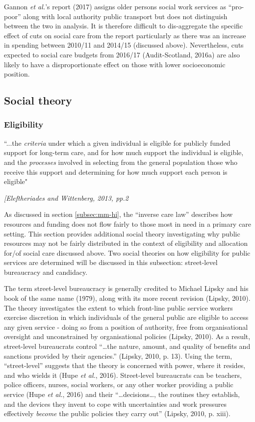 \documentclass[12pt,a4paper,oneside,table]{report}
\begin{document}
Gannon \textit{et al.}'s report (2017) assigns older persons social work
services as ``pro-poor'' along with local authority public transport but
does not distinguish between the two in analysis. It is therefore
difficult to dis-aggregate the specific effect of cuts on social care
from the report particularly as there was an increase in spending
between 2010/11 and 2014/15 (discussed above). Nevertheless, cuts
expected to social care budgets from 2016/17 (Audit-Scotland, 2016a) are
also likely to have a disproportionate effect on those with lower
socioeconomic position.

\subsection{Social theory}\label{subsec:soc-theory}

\subsubsection{Eligibility}\label{subsubsec:eligibility}

\setlength{\epigraphwidth}{0.8\textwidth}
\epigraph{``...the \textit{criteria} under which a given individual is eligible for publicly funded support for long-term care, and for how much support the individual is eligible, and the \textit{processes} involved in selecting from the general population those who receive this support and determining for how much support each person is eligible"}{\textit{[Eleftheriades and Wittenberg, 2013, pp.2}}

As discussed in section \ref{subsec:mm-hi}, the ``inverse care law''
describes how resources and funding does not flow fairly to those most
in need in a primary care setting. This section provides additional
social theory investigating why public resources may not be fairly
distributed in the context of eligibility and allocation for/of social
care discussed above. Two social theories on how eligibility for public
services are determined will be discussed in this subsection:
street-level bureaucracy and candidacy.

The term street-level bureaucracy is generally credited to Michael
Lipsky and his book of the same name (1979), along with its more recent
revision (Lipsky, 2010). The theory investigates the extent to which
front-line public service workers exercise discretion in which
individuals of the general public are eligible to access any given
service - doing so from a position of authority, free from
organisational oversight and unconstrained by organisational policies
(Lipsky, 2010). As a result, street-level bureaucrats control
``\ldots the nature, amount, and quality of benefits and sanctions
provided by their agencies.'' (Lipsky, 2010, p. 13). Using the term,
``street-level'' suggests that the theory is concerned with power, where
it resides, and who wields it (Hupe \emph{et al.}, 2016). Street-level
bureaucrats can be teachers, police officers, nurses, social workers, or
any other worker providing a public service (Hupe \emph{et al.}, 2016)
and their ``\ldots decisions\ldots, the routines they establish, and the
devices they invent to cope with uncertainties and work pressures
effectively \textit{become} the public policies they carry out''
(Lipsky, 2010, p. xiii).
\end{document}
